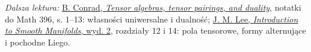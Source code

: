\par\smallskip
{\footnotesize\noindent\emph{Dalsza lektura:}
\href{https://math.stanford.edu/~conrad/diffgeomPage/handouts/tensor.pdf}
{B. Conrad, \emph{Tensor algebras, tensor pairings, and duality}},
notatki do Math 396, s. 1--13: własności uniwersalne i dualność;
\href{https://doi.org/10.1007/978-1-4419-9982-5}
{J. M. Lee, \emph{Introduction to Smooth Manifolds}, wyd. 2},
rozdziały 12 i 14: pola tensorowe, formy alternujące
i pochodne Liego.\par}
\clearpage

